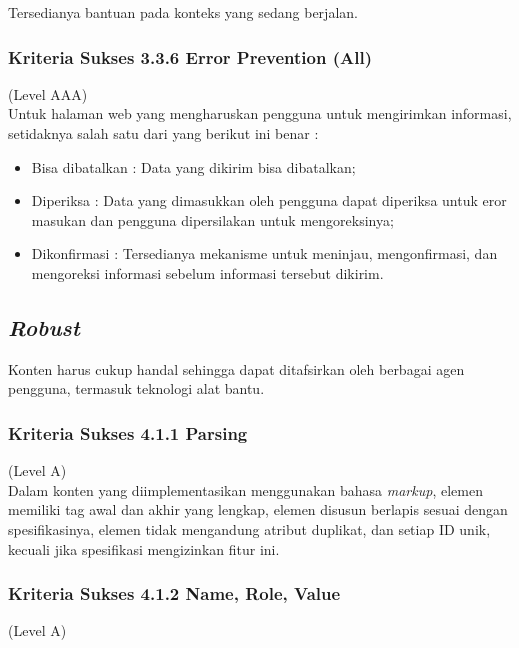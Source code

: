 \documentclass[a4paper,twoside]{article}
\begin{document}
\begin{enumerate}
		Tersedianya bantuan pada konteks yang sedang berjalan.
		
		
		\subsubsection*{Kriteria Sukses 3.3.6 Error Prevention (All)}
		\label{subsubsec:kriteria_3.3.6}
		(Level AAA) \\
		
		Untuk halaman web yang mengharuskan pengguna untuk mengirimkan informasi, setidaknya salah satu dari yang berikut ini benar :
		
		\begin{itemize}
			\item Bisa dibatalkan : Data yang dikirim bisa dibatalkan;
			\item Diperiksa : Data yang dimasukkan oleh pengguna dapat diperiksa untuk eror masukan dan pengguna dipersilakan untuk mengoreksinya;
			\item Dikonfirmasi : Tersedianya mekanisme untuk meninjau, mengonfirmasi, dan mengoreksi informasi sebelum informasi tersebut dikirim.
		\end{itemize}
		
		\subsection*{\textit{Robust}}
		\label{subsec:robust}
		Konten harus cukup handal sehingga dapat ditafsirkan oleh berbagai agen pengguna, termasuk teknologi alat bantu.
		
		\subsubsection*{Kriteria Sukses 4.1.1 Parsing}
		\label{subsubsec:kriteria_4.1.1}
		(Level A) \\
		
		Dalam konten yang diimplementasikan menggunakan bahasa \textit{markup}, elemen memiliki tag awal dan akhir yang lengkap, elemen disusun berlapis sesuai dengan spesifikasinya, elemen tidak mengandung atribut duplikat, dan setiap ID unik, kecuali jika spesifikasi mengizinkan fitur ini.
		
		\subsubsection*{Kriteria Sukses 4.1.2 Name, Role, Value}
		\label{subsubsec:kriteria_4.1.2}
		(Level A) \\
		

\end{enumerate}
\end{document}
